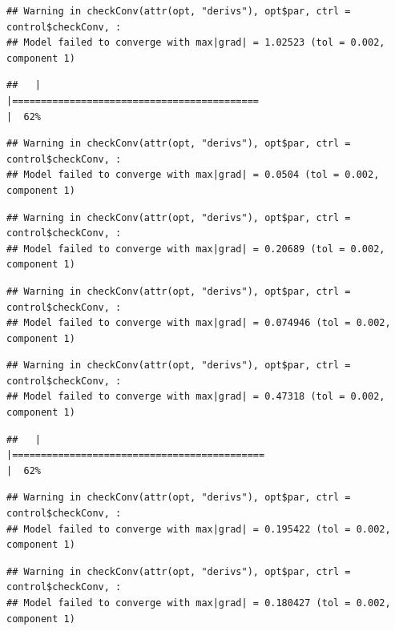 \documentclass[
  12pt,
]{book}
\begin{document}
\begin{verbatim}
## Warning in checkConv(attr(opt, "derivs"), opt$par, ctrl = control$checkConv, :
## Model failed to converge with max|grad| = 1.02523 (tol = 0.002, component 1)
\end{verbatim}

\begin{verbatim}
##   |                                                                              |===========================================                           |  62%
\end{verbatim}

\begin{verbatim}
## Warning in checkConv(attr(opt, "derivs"), opt$par, ctrl = control$checkConv, :
## Model failed to converge with max|grad| = 0.0504 (tol = 0.002, component 1)
\end{verbatim}

\begin{verbatim}
## Warning in checkConv(attr(opt, "derivs"), opt$par, ctrl = control$checkConv, :
## Model failed to converge with max|grad| = 0.20689 (tol = 0.002, component 1)
\end{verbatim}

\begin{verbatim}
## Warning in checkConv(attr(opt, "derivs"), opt$par, ctrl = control$checkConv, :
## Model failed to converge with max|grad| = 0.074946 (tol = 0.002, component 1)
\end{verbatim}

\begin{verbatim}
## Warning in checkConv(attr(opt, "derivs"), opt$par, ctrl = control$checkConv, :
## Model failed to converge with max|grad| = 0.47318 (tol = 0.002, component 1)
\end{verbatim}

\begin{verbatim}
##   |                                                                              |============================================                          |  62%
\end{verbatim}

\begin{verbatim}
## Warning in checkConv(attr(opt, "derivs"), opt$par, ctrl = control$checkConv, :
## Model failed to converge with max|grad| = 0.195422 (tol = 0.002, component 1)
\end{verbatim}

\begin{verbatim}
## Warning in checkConv(attr(opt, "derivs"), opt$par, ctrl = control$checkConv, :
## Model failed to converge with max|grad| = 0.180427 (tol = 0.002, component 1)
\end{verbatim}
\end{document}
